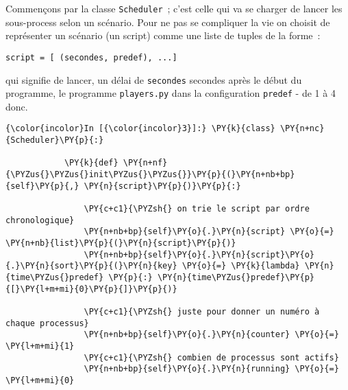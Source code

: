     Commençons par la classe \texttt{Scheduler}~; c'est celle qui va se
charger de lancer les sous-process selon un scénario. Pour ne pas se
compliquer la vie on choisit de représenter un scénario (un script)
comme une liste de tuples de la forme~:

\begin{verbatim}
script = [ (secondes, predef), ...]
\end{verbatim}

qui signifie de lancer, un délai de \texttt{secondes} secondes après le
début du programme, le programme \texttt{players.py} dans la
configuration \texttt{predef} - de 1 à 4 donc.

    \begin{Verbatim}[commandchars=\\\{\}]
{\color{incolor}In [{\color{incolor}3}]:} \PY{k}{class} \PY{n+nc}{Scheduler}\PY{p}{:}
        
            \PY{k}{def} \PY{n+nf}{\PYZus{}\PYZus{}init\PYZus{}\PYZus{}}\PY{p}{(}\PY{n+nb+bp}{self}\PY{p}{,} \PY{n}{script}\PY{p}{)}\PY{p}{:}
        
                \PY{c+c1}{\PYZsh{} on trie le script par ordre chronologique}
                \PY{n+nb+bp}{self}\PY{o}{.}\PY{n}{script} \PY{o}{=} \PY{n+nb}{list}\PY{p}{(}\PY{n}{script}\PY{p}{)}
                \PY{n+nb+bp}{self}\PY{o}{.}\PY{n}{script}\PY{o}{.}\PY{n}{sort}\PY{p}{(}\PY{n}{key} \PY{o}{=} \PY{k}{lambda} \PY{n}{time\PYZus{}predef} \PY{p}{:} \PY{n}{time\PYZus{}predef}\PY{p}{[}\PY{l+m+mi}{0}\PY{p}{]}\PY{p}{)}
        
                \PY{c+c1}{\PYZsh{} juste pour donner un numéro à chaque processus}
                \PY{n+nb+bp}{self}\PY{o}{.}\PY{n}{counter} \PY{o}{=} \PY{l+m+mi}{1}
                \PY{c+c1}{\PYZsh{} combien de processus sont actifs}
                \PY{n+nb+bp}{self}\PY{o}{.}\PY{n}{running} \PY{o}{=} \PY{l+m+mi}{0}
        

\end{Verbatim}
